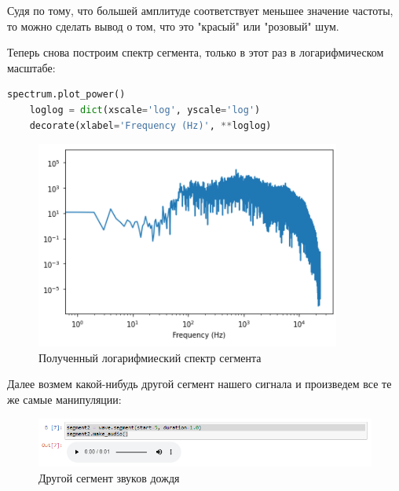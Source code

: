 \documentclass[a4paper]{article}
\begin{document}
            Судя по тому, что большей амплитуде соответствует меньшее значение  частоты, то можно сделать вывод о том, что это "красый" или "розовый" шум.
            
            Теперь снова построим спектр сегмента, только в этот раз в логарифмическом масштабе:
            
\begin{lstlisting}[language=Python, caption= Получение логарифмиеского спектра сегмента]
    spectrum.plot_power()
    loglog = dict(xscale='log', yscale='log')
    decorate(xlabel='Frequency (Hz)', **loglog)
\end{lstlisting}               
            
            \begin{figure}[H]
                \centering
                \includegraphics{ex_1_rain_log_spectr.png}
                \caption{Полученный логарифмиеский спектр сегмента}
                \label{fig:ex_1_rain_log_spectr}
            \end{figure}
            
            Далее возмем какой-нибудь другой сегмент нашего сигнала и произведем все те же самые манипуляции:
            
             \begin{figure}[H]
                \centering
                \includegraphics[width=\textwidth]{ex_1_rain_second_segment_audio.png}
                \caption{Другой сегмент звуков дождя}
                \label{fig:ex_1_rain_second_segment_audio}
            \end{figure}
            
\end{document}
